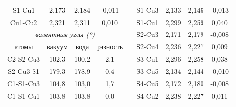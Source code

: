 \documentclass[a4paper,12pt]{article}
\begin{document}
\begin{onehalfspace}
\begin{table}[H]
\begin{tabular}{|cccc|ccccc}
			\multicolumn{1}{|c|}{S1-Cu1}         & \multicolumn{1}{c|}{2,173}  & \multicolumn{1}{c|}{2,184} & -0,011   & \multicolumn{1}{c|}{} & \multicolumn{1}{c|}{S1-Cu3}  & \multicolumn{1}{c|}{2,133}    & \multicolumn{1}{c|}{2,146}    & \multicolumn{1}{c|}{-0,013}   \\ \cline{1-4} \cline{6-9} 
			\multicolumn{1}{|c|}{Cu1-Cu2}        & \multicolumn{1}{c|}{2,321}  & \multicolumn{1}{c|}{2,311} & 0,010    & \multicolumn{1}{c|}{} & \multicolumn{1}{c|}{S1-Cu1}  & \multicolumn{1}{c|}{2,299}    & \multicolumn{1}{c|}{2,259}    & \multicolumn{1}{c|}{0,040}    \\ \cline{1-4} \cline{6-9} 
			\multicolumn{4}{|c|}{\textit{валентные углы (º)}}                                                          & \multicolumn{1}{c|}{} & \multicolumn{1}{c|}{S2-Cu3}  & \multicolumn{1}{c|}{2,171}    & \multicolumn{1}{c|}{2,179}    & \multicolumn{1}{c|}{-0,008}   \\ \cline{1-4} \cline{6-9} 
			\multicolumn{1}{|c|}{атомы}          & \multicolumn{1}{c|}{вакуум} & \multicolumn{1}{c|}{вода}  & разность & \multicolumn{1}{c|}{} & \multicolumn{1}{c|}{S2-Cu4}  & \multicolumn{1}{c|}{2,236}    & \multicolumn{1}{c|}{2,227}    & \multicolumn{1}{c|}{0,009}    \\ \cline{1-4} \cline{6-9} 
			\multicolumn{1}{|c|}{C2-S2-Cu3}      & \multicolumn{1}{c|}{102,3}  & \multicolumn{1}{c|}{100,2} & 2,1      & \multicolumn{1}{c|}{} & \multicolumn{1}{c|}{S3-Cu1}  & \multicolumn{1}{c|}{2,296}    & \multicolumn{1}{c|}{2,258}    & \multicolumn{1}{c|}{0,038}    \\ \cline{1-4} \cline{6-9} 
			\multicolumn{1}{|c|}{S2-Cu3-S1}      & \multicolumn{1}{c|}{179,3}  & \multicolumn{1}{c|}{178,9} & 0,4      & \multicolumn{1}{c|}{} & \multicolumn{1}{c|}{S3-Cu5}  & \multicolumn{1}{c|}{2,134}    & \multicolumn{1}{c|}{2,144}    & \multicolumn{1}{c|}{-0,010}   \\ \cline{1-4} \cline{6-9} 
			\multicolumn{1}{|c|}{C1-S1-Cu3}      & \multicolumn{1}{c|}{104,8}  & \multicolumn{1}{c|}{103,0} & 1,7      & \multicolumn{1}{c|}{} & \multicolumn{1}{c|}{S4-Cu5}  & \multicolumn{1}{c|}{2,172}    & \multicolumn{1}{c|}{2,180}    & \multicolumn{1}{c|}{-0,008}   \\ \cline{1-4} \cline{6-9} 
			\multicolumn{1}{|c|}{C1-S1-Cu1}      & \multicolumn{1}{c|}{103,8}  & \multicolumn{1}{c|}{103,8} & 0,0      & \multicolumn{1}{c|}{} & \multicolumn{1}{c|}{S4-Cu2}  & \multicolumn{1}{c|}{2,238}    & \multicolumn{1}{c|}{2,227}    & \multicolumn{1}{c|}{0,011}    \\ \cline{1-4} \cline{6-9} 

\end{tabular}
\end{table}
\end{onehalfspace}
\end{document}

